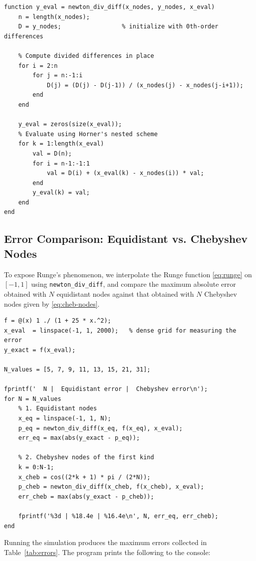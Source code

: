 \documentclass[12pt, a4paper]{article}
\theoremstyle{plain}
\theoremstyle{definition}
\theoremstyle{remark}
\begin{document}
\begin{lstlisting}[caption={Newton interpolation via divided differences.}, label={lst:newton}]
function y_eval = newton_div_diff(x_nodes, y_nodes, x_eval)
    n = length(x_nodes);
    D = y_nodes;                 % initialize with 0th-order differences

    % Compute divided differences in place
    for i = 2:n
        for j = n:-1:i
            D(j) = (D(j) - D(j-1)) / (x_nodes(j) - x_nodes(j-i+1));
        end
    end

    y_eval = zeros(size(x_eval));
    % Evaluate using Horner's nested scheme
    for k = 1:length(x_eval)
        val = D(n);
        for i = n-1:-1:1
            val = D(i) + (x_eval(k) - x_nodes(i)) * val;
        end
        y_eval(k) = val;
    end
end
\end{lstlisting}

\subsection{Error Comparison: Equidistant vs. Chebyshev Nodes}

To expose Runge's phenomenon, we interpolate the Runge function \eqref{eq:runge} on $[-1,1]$ using \texttt{newton\_div\_diff}, and compare the maximum absolute error obtained with $N$ equidistant nodes against that obtained with $N$ Chebyshev nodes given by \eqref{eq:cheb-nodes}.

\begin{lstlisting}[caption={Simulation of Runge's phenomenon and error comparison.}, label={lst:sim}]
f = @(x) 1 ./ (1 + 25 * x.^2);
x_eval  = linspace(-1, 1, 2000);   % dense grid for measuring the error
y_exact = f(x_eval);

N_values = [5, 7, 9, 11, 13, 15, 21, 31];

fprintf('  N |  Equidistant error |  Chebyshev error\n');
for N = N_values
    % 1. Equidistant nodes
    x_eq = linspace(-1, 1, N);
    p_eq = newton_div_diff(x_eq, f(x_eq), x_eval);
    err_eq = max(abs(y_exact - p_eq));

    % 2. Chebyshev nodes of the first kind
    k = 0:N-1;
    x_cheb = cos((2*k + 1) * pi / (2*N));
    p_cheb = newton_div_diff(x_cheb, f(x_cheb), x_eval);
    err_cheb = max(abs(y_exact - p_cheb));

    fprintf('%3d | %18.4e | %16.4e\n', N, err_eq, err_cheb);
end
\end{lstlisting}

Running the simulation produces the maximum errors collected in Table~\ref{tab:errors}. The program prints the following to the console:
\end{document}
